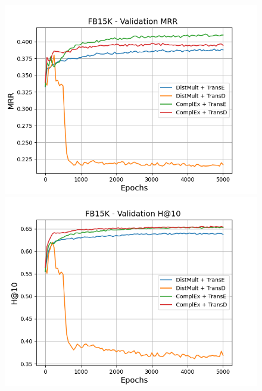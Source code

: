 \begin{figure}
    \centering
    \begin{minipage}{.5\textwidth}
      \centering
      \includegraphics[width=\linewidth]{figures/results/gan_train/pretrained/uncertainty/max/entropy/fb15k/5k_epochs/uncertainty_fb15k_mrrs.png}
    \end{minipage}%
    \begin{minipage}{.5\textwidth}
      \centering
      \includegraphics[width=\linewidth]{figures/results/gan_train/pretrained/uncertainty/max/entropy/fb15k/5k_epochs/uncertainty_fb15k_hit10.png}
    \end{minipage}
    

\end{figure}
